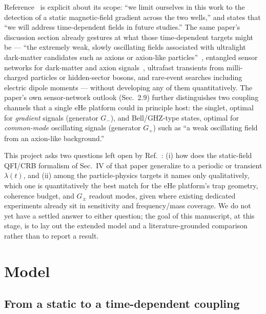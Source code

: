 \documentclass[aps,prxquantum,reprint,superscriptaddress,longbibliography]{revtex4-2}
\begin{document}
Reference~\cite{perruzza2026} is explicit about its scope: ``we limit ourselves in this work to the
detection of a static magnetic-field gradient across the two wells,'' and states that ``we will
address time-dependent fields in future studies.'' The same paper's discussion section already
gestures at what those time-dependent targets might be — ``the extremely weak, slowly oscillating
fields associated with ultralight dark-matter candidates such as axions or axion-like
particles''~\cite{graham2013new,abel2017search,budker2014proposal}, entangled sensor networks for
dark-matter and axion signals~\cite{brady2022entangled,derevianko2018detecting}, ultrafast transients
from milli-charged particles or hidden-sector bosons, and rare-event searches including electric
dipole moments — without developing any of them quantitatively. The paper's own sensor-network
outlook (Sec.~2.9) further distinguishes two coupling channels that a single eHe platform could in
principle host: the singlet, optimal for \emph{gradient} signals (generator $G_-$), and Bell/GHZ-type
states, optimal for \emph{common-mode} oscillating signals (generator $G_+$) such as ``a weak
oscillating field from an axion-like background.''

This project asks two questions left open by Ref.~\cite{perruzza2026}: (i) how does the static-field
QFI/CRB formalism of Sec.~IV of that paper generalize to a periodic or transient $\lambda(t)$, and
(ii) among the particle-physics targets it names only qualitatively, which one is quantitatively the
best match for the eHe platform's trap geometry, coherence budget, and $G_\pm$ readout modes, given
where existing dedicated experiments already sit in sensitivity and frequency/mass coverage. We do
not yet have a settled answer to either question; the goal of this manuscript, at this stage, is to
lay out the extended model and a literature-grounded comparison rather than to report a result.

\section{Model}
\label{sec:model}

\subsection{From a static to a time-dependent coupling}
\end{document}
